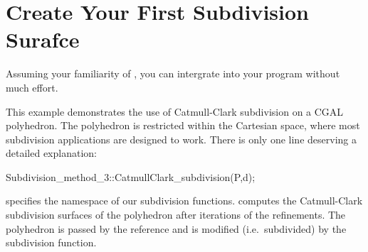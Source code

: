 




\section{Create Your First Subdivision Surafce}
\label{secFirstSub}
Assuming your familiarity of ,
you can intergrate  into your program 
without much effort.


This example demonstrates the use of Catmull-Clark subdivision
on a CGAL polyhedron. The polyhedron is restricted within the Cartesian
space, where most subdivision applications are designed to work.
There is only one line deserving a detailed explanation:
\begin{ccExampleCode}
Subdivision_method_3::CatmullClark_subdivision(P,d);
\end{ccExampleCode}
 specifies the namespace of our
subdivision functions.  computes the 
Catmull-Clark subdivision surfaces of the polyhedron  after
 iterations of the refinements. The polyhedron  is 
passed by the reference and is modified (i.e.~subdivided) by the 
subdivision function.

